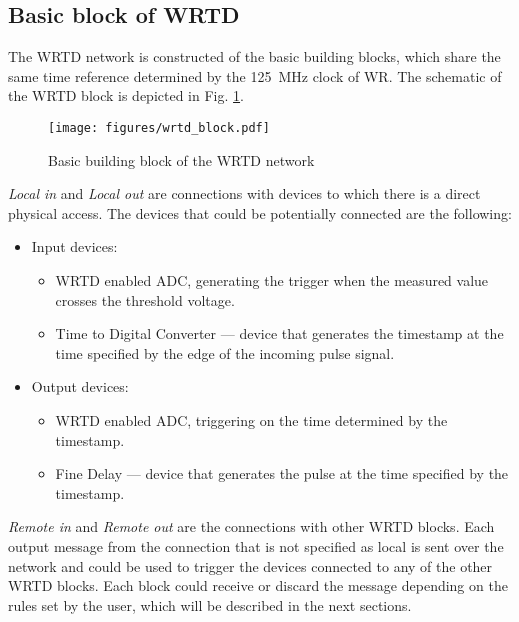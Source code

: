     \subsection{Basic block of WRTD} \label{subsec:WRTD_block}
        The WRTD network is constructed of the basic building blocks, which share the same time reference determined by the 125~MHz clock of WR. The schematic of the WRTD block is depicted in Fig. \ref{fig:wrtd_block}.
        \begin{figure}
        	\centerline{\texttt{[image: figures/wrtd\_block.pdf]}}
        	\caption{Basic building block of the WRTD network}
        	\label{fig:wrtd_block}
        \end{figure}
        \textit{Local in} and \textit{Local out} are connections with devices to which there is a direct physical access. The devices that could be potentially connected are the following:
        \begin{itemize}
            \item Input devices:
            \begin{itemize}
                \item WRTD enabled ADC, generating the trigger when the measured value crosses the threshold voltage.
                \item Time to Digital Converter --- device that generates the timestamp at the time specified by the edge of the incoming pulse signal.
            \end{itemize}
            \item Output devices:
            \begin{itemize}
                \item WRTD enabled ADC, triggering on the time determined by the timestamp.
                \item Fine Delay --- device that generates the pulse at the time specified by the timestamp.
            \end{itemize}
        \end{itemize}
        \textit{Remote in} and \textit{Remote out} are the connections with other WRTD blocks. Each output message from the connection that is not specified as local is sent over the network and could be used to trigger the devices connected to any of the other WRTD blocks. Each block could receive or discard the message depending on the rules set by the user, which will be described in the next sections.


